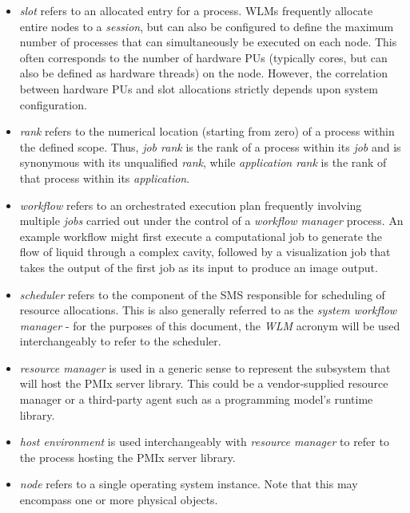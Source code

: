 \begin{itemize}
\item {}\emph{slot} refers to an allocated entry for a process. \acp{WLM} frequently allocate entire nodes to a \emph{session}, but can also be configured to define the maximum number of processes that can simultaneously be executed on each node. This often corresponds to the number of hardware \acp{PU} (typically cores, but can also be defined as hardware threads) on the node. However, the correlation between hardware \acp{PU} and slot allocations strictly depends upon system configuration.

\item {}\emph{rank} refers to the numerical location (starting from zero) of a process within the defined scope. Thus, \emph{job rank} is the rank of a process within its \emph{job} and is synonymous with its unqualified \emph{rank}, while \emph{application rank} is the rank of that process within its \emph{application}.

\item {}\emph{workflow} refers to an orchestrated execution plan frequently involving multiple \emph{jobs} carried out under the control of a \emph{workflow manager} process. An example workflow might first execute a computational job to generate the flow of liquid through a complex cavity, followed by a visualization job that takes the output of the first job as its input to produce an image output.

\item {}\emph{scheduler} refers to the component of the \ac{SMS} responsible for scheduling of resource allocations. This is also generally referred to as the \emph{system workflow manager} - for the purposes of this document, the \emph{WLM} acronym will be used interchangeably to refer to the scheduler.

\item {}\emph{resource manager} is used in a generic sense to represent the subsystem that will host the \ac{PMIx} server library. This could be a vendor-supplied resource manager or a third-party agent such as a programming model's runtime library.

\item {}\emph{host environment} is used interchangeably with \emph{resource manager} to refer to the process hosting the \ac{PMIx} server library.

\item {}\emph{node} refers to a single operating system instance. Note that this may encompass one or more physical objects.


\end{itemize}
